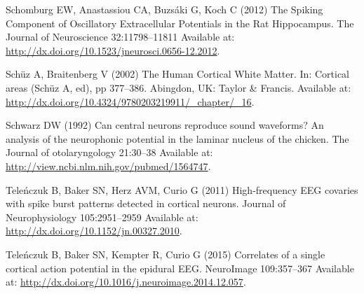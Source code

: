 \documentclass[]{article}
\begin{document}
Schomburg EW, Anastassiou CA, Buzsáki G, Koch C (2012) The Spiking
Component of Oscillatory Extracellular Potentials in the Rat
Hippocampus. The Journal of Neuroscience 32:11798--11811 Available at:
\url{http://dx.doi.org/10.1523/jneurosci.0656-12.2012}.

Schüz A, Braitenberg V (2002) The Human Cortical White Matter. In:
Cortical areas (Schüz A, ed), pp 377--386. Abingdon, UK: Taylor \&
Francis. Available at:
\url{http://dx.doi.org/10.4324/9780203219911/_chapter/_16}.

Schwarz DW (1992) Can central neurons reproduce sound waveforms? An
analysis of the neurophonic potential in the laminar nucleus of the
chicken. The Journal of otolaryngology 21:30--38 Available at:
\url{http://view.ncbi.nlm.nih.gov/pubmed/1564747}.

Teleńczuk B, Baker SN, Herz AVM, Curio G (2011) High-frequency EEG
covaries with spike burst patterns detected in cortical neurons. Journal
of Neurophysiology 105:2951--2959 Available at:
\url{http://dx.doi.org/10.1152/jn.00327.2010}.

Teleńczuk B, Baker SN, Kempter R, Curio G (2015) Correlates of a single
cortical action potential in the epidural EEG. NeuroImage 109:357--367
Available at: \url{http://dx.doi.org/10.1016/j.neuroimage.2014.12.057}.
\end{document}
